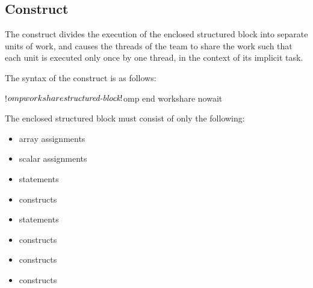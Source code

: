 \vspace{3\baselineskip}
\begin{fortranspecific}
\vspace{-1\baselineskip}
\subsection{ Construct}
\label{subsec:workshare Construct}
\summary
The  construct divides the execution of the enclosed structured block into
separate units of work, and causes the threads of the team to share the work such that
each unit is executed only once by one thread, in the context of its implicit task.

\syntax
The syntax of the  construct is as follows:

\begin{ompfPragma}
!$omp workshare
    \plc{structured-block}
!$omp end workshare \plc{[}nowait\plc{]}
\end{ompfPragma}

The enclosed structured block must consist of only the following:

\begin{itemize}
\item array assignments

\item scalar assignments

\item {} statements

\item {} constructs

\item {} statements

\item {} constructs

\item {} constructs

\item {} constructs


\end{itemize}
\end{fortranspecific}
